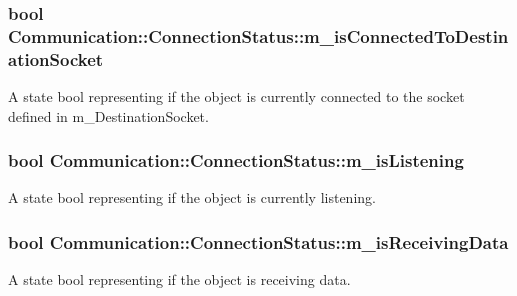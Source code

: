 \subsubsection[{m\+\_\+is\+Connected\+To\+Destination\+Socket}]{\setlength{\rightskip}{0pt plus 5cm}bool Communication\+::\+Connection\+Status\+::m\+\_\+is\+Connected\+To\+Destination\+Socket\hspace{0.3cm}{\ttfamily [private]}}\label{class_communication_1_1_connection_status_a75682bfd7179c2de4e54b15f3080cc73}
A state bool representing if the object is currently connected to the socket defined in m\+\_\+\+Destination\+Socket. \hypertarget{class_communication_1_1_connection_status_af805eedc14d916294b7ef4ec70e8b24b}{}
\subsubsection[{m\+\_\+is\+Listening}]{\setlength{\rightskip}{0pt plus 5cm}bool Communication\+::\+Connection\+Status\+::m\+\_\+is\+Listening\hspace{0.3cm}{\ttfamily [private]}}\label{class_communication_1_1_connection_status_af805eedc14d916294b7ef4ec70e8b24b}


A state bool representing if the object is currently listening. 

\hypertarget{class_communication_1_1_connection_status_a4c8edb70feb123e6a5e6cd75ddcdd468}{}
\subsubsection[{m\+\_\+is\+Receiving\+Data}]{\setlength{\rightskip}{0pt plus 5cm}bool Communication\+::\+Connection\+Status\+::m\+\_\+is\+Receiving\+Data\hspace{0.3cm}{\ttfamily [private]}}\label{class_communication_1_1_connection_status_a4c8edb70feb123e6a5e6cd75ddcdd468}


A state bool representing if the object is receiving data. 

\hypertarget{class_communication_1_1_connection_status_aeb89ad295c5f513ee4388a6e8fe8b997}{}
